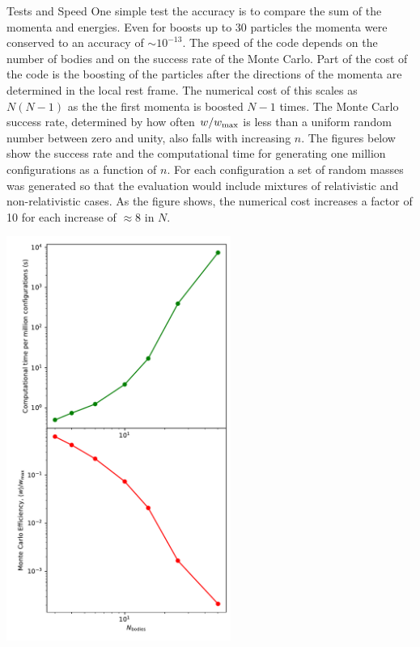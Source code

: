 \documentclass[11pt]{article}
\begin{document}
{\rm Tests and Speed}
One simple test the accuracy is to compare the sum of the momenta and energies. Even for boosts up to 30 particles the momenta were conserved to an accuracy of $\sim 10^{-13}$. The speed of the code depends on the number of bodies and on the success rate of the Monte Carlo. Part of the cost of the code is the boosting of the particles after the directions of the momenta are determined in the local rest frame. The numerical cost of this scales as $N(N-1)$ as the the first momenta is boosted $N-1$ times. The Monte Carlo success rate, determined by how often $w/w_{\rm max}$ is less than a uniform random number between zero and unity, also falls with increasing $n$. The figures below show the success rate and the computational time for generating one million configurations as a function of $n$. For each configuration a set of random masses was generated so that the evaluation would include mixtures of relativistic and non-relativistic cases. As the figure shows, the numerical cost increases a factor of 10 for each increase of $\approx 8$ in $N$.

\centerline{\includegraphics[width=0.55\textwidth]{efficiency}}
\end{document}
